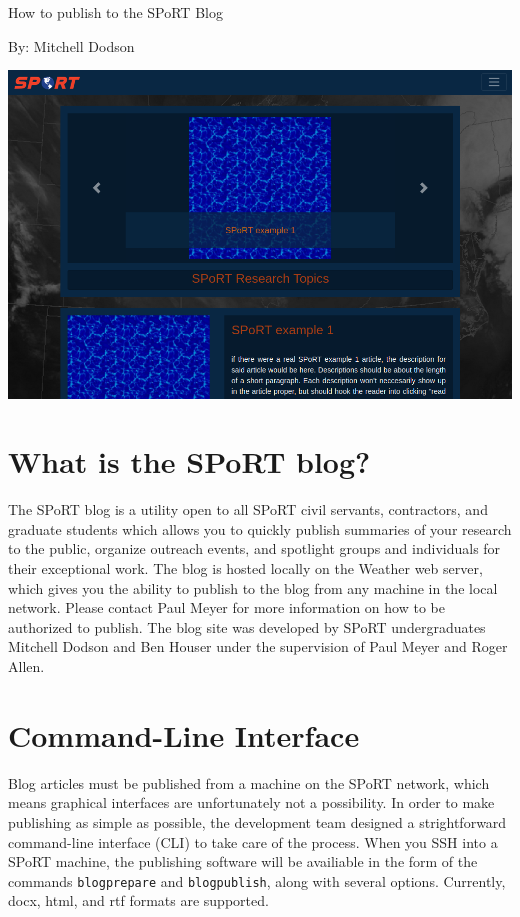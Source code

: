 \documentclass[12pt]{article}
\begin{document}
\thispagestyle{empty}

\begin{center}\LARGE
How to publish to the SPoRT Blog
\end{center}

\begin{center}\large
  By: Mitchell Dodson
\end{center}

\begin{multicols}{2}

{
  \centering
  \includegraphics[width=.95\linewidth]{./figures/website-ss.png}
}

\section{What is the SPoRT blog?}

The SPoRT blog is a utility open to all SPoRT civil servants, contractors, and graduate students which allows you to quickly publish summaries of your research to the public, organize outreach events, and spotlight groups and individuals for their exceptional work. The blog is hosted locally on the Weather web server, which gives you the ability to publish to the blog from any machine in the local network. Please contact Paul Meyer for more information on how to be authorized to publish. The blog site was developed by SPoRT undergraduates Mitchell Dodson and Ben Houser under the supervision of Paul Meyer and Roger Allen.

\section{Command-Line Interface}

Blog articles must be published from a machine on the SPoRT network, which means graphical interfaces are unfortunately not a possibility. In order to make publishing as simple as possible, the development team designed a strightforward command-line interface (CLI) to take care of the process. When you SSH into a SPoRT machine, the publishing software will be availiable in the form of the commands \texttt{blogprepare} and \texttt{blogpublish}, along with several options. Currently, docx, html, and rtf formats are supported.


\end{multicols}
\end{document}
